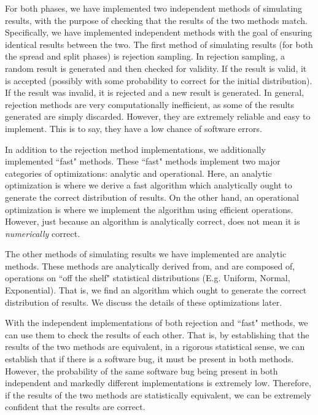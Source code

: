 \documentclass{article}
\begin{document}
For both phases, we have implemented two independent methods of simulating
results, with the purpose of checking that the results of the two methods match.
Specifically, we have implemented independent methods with the goal of ensuring
identical results between the two.
The first method of simulating results (for both the spread and split phases) is
rejection sampling.
In rejection sampling, a random result is generated and then checked for
validity.
If the result is valid, it is accepted (possibly with some probability to
correct for the initial distribution).
If the result was invalid, it is rejected and a new result is generated.
In general, rejection methods are very computationally inefficient, as some of
the results generated are simply discarded. 
However, they are extremely reliable and easy to implement.
This is to say, they have a low chance of software errors.

In addition to the rejection method implementations, we additionally implemented 
``fast" methods.
These ``fast" methods implement two major categories of optimizations: analytic
and operational.
Here, an analytic optimization is where we derive a fast algorithm which
analytically ought to generate the correct distribution of results.
On the other hand, an operational optimization is where we implement the
algorithm using efficient operations.
However, just because an algorithm is analytically correct, does not mean it is
\textit{numerically} correct\cite{goldberg_what_1991, noauthor_ieee_1985}.

The other methods of simulating results we have implemented are analytic
methods.
These methods are analytically derived from, and are composed of, operations on
``off the shelf" statistical distributions (E.g. Uniform, Normal, Exponential).
That is, we find an algorithm which ought to generate the correct distribution
of results.
We discuss the details of these optimizations later.

With the independent implementations of both rejection and ``fast" methods, we
can use them to check the results of each other.
That is, by establishing that the results of the two methods are equivalent, in
a rigorous statistical sense, we can establish that if there is a software bug,
it must be present in both methods.
However, the probability of the same software bug being present in both
independent and markedly different implementations is extremely low.
Therefore, if the results of the two methods are statistically equivalent, we
can be extremely confident that the results are correct.
\end{document}
